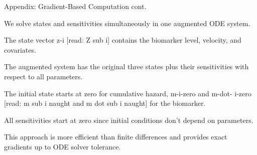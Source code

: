\documentclass[aspectratio=169,12pt]{beamer}
\begin{document}
\begin{frame}{Appendix: Gradient-Based Computation cont.}
{    We solve states and sensitivities simultaneously in one augmented ODE system.

    The state vector z-i [read: Z sub i] contains the biomarker level,
    velocity, and covariates.

    The augmented system has the original three states plus their sensitivities
    with respect to all parameters.

    The initial state starts at zero for cumulative hazard, m-i-zero and m-dot-
    i-zero [read: m sub i naught and m dot sub i naught] for the biomarker.

    All sensitivities start at zero since initial conditions don't depend on
    parameters.

    This approach is more efficient than finite differences and provides exact
    gradients up to ODE solver tolerance.
    \normalsize
  }
\end{frame}
\end{document}
